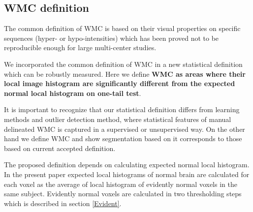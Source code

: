 \subsection{WMC definition} \label{definition}
The common definition of WMC is based on their visual properties on specific sequences (hyper- or hypo-intensities) which has been proved not to be reproducible enough for large multi-center studies. 
\par
We incorporated the common definition of WMC in a new statistical definition which can be robustly measured. Here we  define \textbf{WMC as areas where their local image histogram are significantly different from the expected normal local histogram on one-tail test}.
\par
It is important to recognize that our statistical definition differs from learning methods and outlier detection method, where statistical features of manual delineated WMC is captured in a supervised or unsupervised way.
On the other hand we define WMC and show segmentation based on it corresponds to those based on current accepted definition.
\par
The proposed definition depends on calculating expected normal local histogram. In the present paper expected local histograms of normal brain are calculated for each voxel as the average of local histogram of evidently normal voxels in the same subject. Evidently normal voxels are calculated in two thresholding steps which is described in section \ref{Evident}.
  
  
  
  